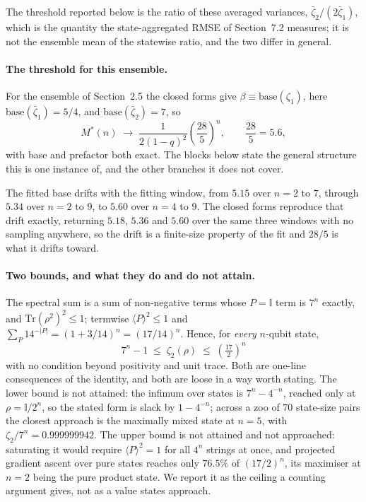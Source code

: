 \documentclass[a4paper,superscriptaddress,nofootinbib,onecolumn,nopdfoutputerror]{quantumarticle}
\begin{document}
The threshold reported below is the ratio of these averaged variances,
\(\bar\zeta_2/(2\bar\zeta_1)\), which is the quantity the state-aggregated
RMSE of Section~7.2 measures; it is not the ensemble mean of the statewise
ratio, and the two differ in general.

\paragraph{The threshold for this ensemble.}
For the ensemble of Section~2.5 the closed forms give
\(\beta \equiv \mathrm{base}(\zeta_1)\), here \(\mathrm{base}(\bar\zeta_1) = 5/4\), and
\(\mathrm{base}(\bar\zeta_2) = 7\), so
\[
M^*(n) \;\longrightarrow\; \frac{1}{2(1-q)^2}\left(\frac{28}{5}\right)^{\! n},
\qquad \frac{28}{5} = 5.6 ,
\]
with base and prefactor both exact. The blocks below state the general structure this is one instance of, and the other branches it
does not cover.

The fitted base drifts with the fitting window, from \(5.15\) over \(n = 2\) to \(7\), through \(5.34\) over \(n = 2\) to \(9\), to \(5.60\)
over \(n = 4\) to \(9\). The closed forms reproduce that drift exactly,
returning \(5.18\), \(5.36\) and \(5.60\) over the same three windows with
no sampling anywhere, so the drift is a finite-size property of the fit and
\(28/5\) is what it drifts toward.

\paragraph{Two bounds, and what they do and do not attain.}
The spectral sum is a sum of non-negative terms whose \(P = \mathbb{I}\) term is
\(7^n\) exactly, and \(\mathrm{Tr}(\rho^2)^2 \le 1\); termwise
\(\langle P\rangle^2 \le 1\) and \(\sum_P 14^{-|P|} = (1 + 3/14)^n = (17/14)^n\).
Hence, for \emph{every} \(n\)-qubit state,
\[
\boxed{\;7^n - 1 \;\le\; \zeta_2(\rho) \;\le\; \left(\tfrac{17}{2}\right)^{\! n}\;}
\]
with no condition beyond positivity and unit trace. Both are one-line consequences of the
identity, and both are loose in a way worth stating. The lower bound is not attained: the
infimum over states is \(7^n - 4^{-n}\), reached only at \(\rho = \mathbb{I}/2^n\), so the
stated form is slack by \(1 - 4^{-n}\); across a zoo of \(70\) state-size pairs the closest
approach is the maximally mixed state at \(n = 5\), with \(\zeta_2/7^n = 0.999999942\). The
upper bound is not attained and not approached: saturating it would require
\(\langle P\rangle^2 = 1\) for all \(4^n\) strings at once, and projected gradient ascent over
pure states reaches only \(76.5\%\) of \((17/2)^n\), its maximiser at \(n = 2\) being the pure
product state. We report it as the ceiling a counting argument gives, not as a value states
approach.
\end{document}
